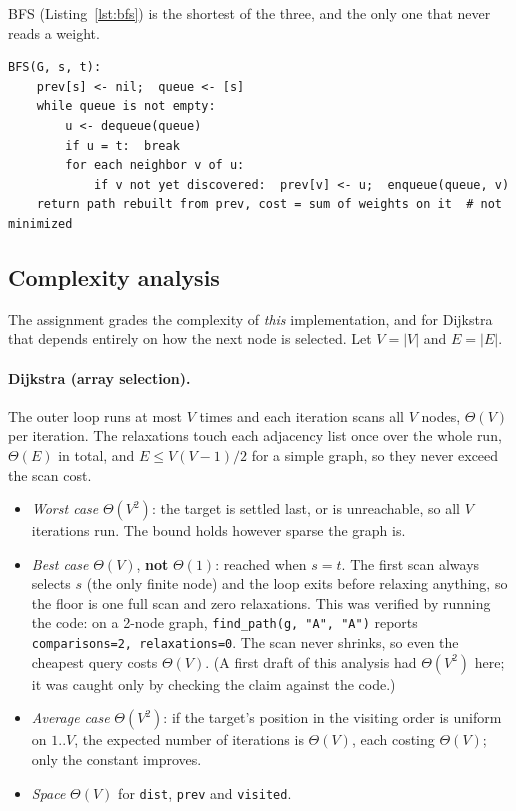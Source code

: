 \documentclass[11pt,a4paper]{article}
\begin{document}
BFS (Listing~\ref{lst:bfs}) is the shortest of the three, and the only one that never reads a weight.

\begin{lstlisting}[language={}, caption={Breadth-first search (algorithms/bfs.py).}, label={lst:bfs}]
BFS(G, s, t):
    prev[s] <- nil;  queue <- [s]
    while queue is not empty:
        u <- dequeue(queue)
        if u = t:  break
        for each neighbor v of u:
            if v not yet discovered:  prev[v] <- u;  enqueue(queue, v)
    return path rebuilt from prev, cost = sum of weights on it  # not minimized
\end{lstlisting}

\subsection{Complexity analysis}
\label{sec:complexity}

The assignment grades the complexity of \emph{this} implementation, and for Dijkstra that
depends entirely on how the next node is selected. Let $V=|V|$ and $E=|E|$.

\paragraph{Dijkstra (array selection).}
The outer loop runs at most $V$ times and each iteration scans all $V$ nodes, $\Theta(V)$
per iteration. The relaxations touch each adjacency list once over the whole run, $\Theta(E)$
in total, and $E\le V(V-1)/2$ for a simple graph, so they never exceed the scan cost.
\begin{itemize}
  \item \emph{Worst case} $\Theta(V^2)$: the target is settled last, or is unreachable, so
        all $V$ iterations run. The bound holds however sparse the graph is.
  \item \emph{Best case} $\Theta(V)$, \textbf{not} $\Theta(1)$: reached when $s=t$. The first
        scan always selects $s$ (the only finite node) and the loop exits before relaxing
        anything, so the floor is one full scan and zero relaxations. This was verified by running
        the code: on a 2-node graph, \texttt{find\_path(g, "A", "A")} reports
        \texttt{comparisons=2, relaxations=0}. The scan never shrinks, so even the cheapest
        query costs $\Theta(V)$. (A first draft of this analysis had $\Theta(V^2)$ here; it was
        caught only by checking the claim against the code.)
  \item \emph{Average case} $\Theta(V^2)$: if the target's position in the visiting order is
        uniform on $1..V$, the expected number of iterations is $\Theta(V)$, each costing
        $\Theta(V)$; only the constant improves.
  \item \emph{Space} $\Theta(V)$ for \texttt{dist}, \texttt{prev} and \texttt{visited}.
\end{itemize}
\end{document}
